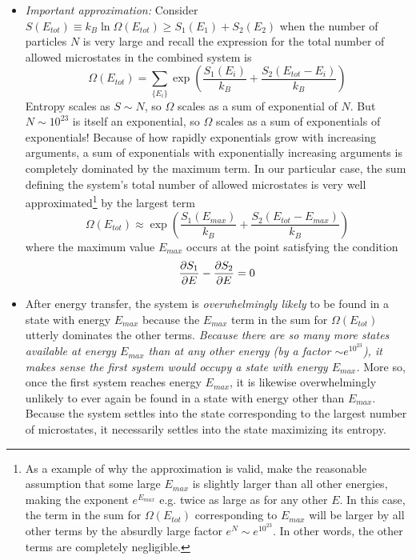 \documentclass[11pt, a4paper]{article}
\begin{document}
\begin{itemize}
	\item \textit{Important approximation:} Consider $ S(E_{tot}) \equiv k_{B}\ln \Omega(E_{tot}) \geq S_{1}(E_{1}) + S_{2}(E_{2}) $ when the number of particles $ N $ is very large and recall the expression for the total number of allowed microstates in the combined system is 
	\begin{equation*}
		\Omega(E_{tot}) = \sum_{\{E_{i}\}} \exp(\frac{S_{1}(E_{i})}{k_{B}} + \frac{S_{2}(E_{tot} - E_{i})}{k_{B}})
	\end{equation*}	
	Entropy scales as $ S \sim N $, so $ \Omega $ scales as a sum of exponential of $ N $. But $ N \sim 10^{23} $ is itself an exponential, so $ \Omega $ scales as a sum of exponentials of exponentials! Because of how rapidly exponentials grow with increasing arguments, a sum of exponentials with exponentially increasing arguments is completely dominated by the maximum term. In our particular case, the sum defining the system's total number of allowed microstates is very well approximated\footnote{ As a example of why the approximation is valid, make the reasonable assumption that some large $ E_{max} $ is slightly larger than all other energies, making the exponent $ e^{E_{max}} $ e.g. twice as large as for any other $ E $. In this case, the term in the sum for $ \Omega(E_{tot}) $ corresponding to $ E_{max} $ will be larger by all other terms by the absurdly large factor $ e^{N} \sim e^{10^{23}} $. In other words, the other terms are completely negligible.} by the largest term
	\begin{equation*}
		\Omega(E_{tot}) \approx \exp(\frac{S_{1}(E_{max})}{k_{B}} + \frac{S_{2}(E_{tot} - E_{max})}{k_{B}})
	\end{equation*}	
	where the maximum value $ E_{max} $ occurs at the point satisfying the condition 
	\begin{equation*}
		\pdv{S_{1}}{E} (E_{max}) - \pdv{S_{2}}{E} (E_{tot} - E_{max}) = 0
	\end{equation*}
		
	\item After energy transfer, the system is \textit{overwhelmingly likely} to be found in a state with energy $ E_{max} $ because the $ E_{max} $ term in the sum for $ \Omega(E_{tot}) $ utterly dominates the other terms. \textit{Because there are so many more states available at energy $ E_{max} $ than at any other energy (by a factor $ \sim e^{10^{23}} $), it makes sense the first system would occupy a state with energy $ E_{max} $.} More so, once the first system reaches energy $ E_{max} $, it is likewise overwhelmingly unlikely to ever again be found in a state with energy other than $ E_{max} $. Because the system settles into the state corresponding to the largest number of microstates, it necessarily settles into the state maximizing its entropy. 
	

\end{itemize}
\end{document}
